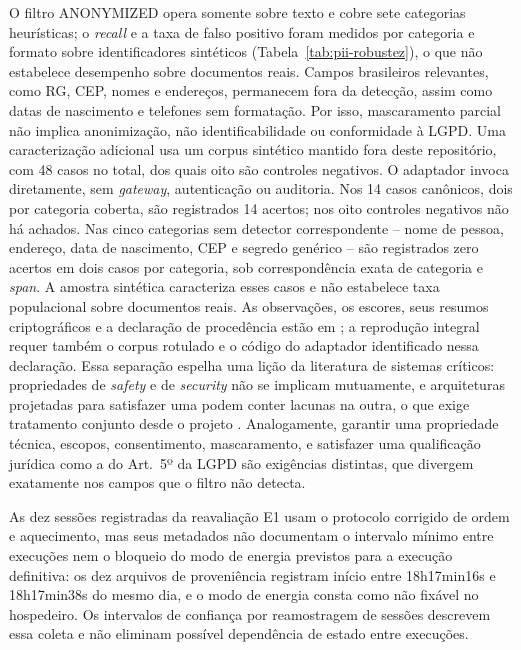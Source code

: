 O filtro ANONYMIZED opera somente sobre texto e cobre sete categorias heurísticas; o \textit{recall} e a taxa de falso positivo foram medidos por categoria e formato sobre identificadores sintéticos (Tabela~\ref{tab:pii-robustez}), o que não estabelece desempenho sobre documentos reais. Campos brasileiros relevantes, como RG, CEP, nomes e endereços, permanecem fora da detecção, assim como datas de nascimento e telefones sem formatação. Por isso, mascaramento parcial não implica anonimização, não identificabilidade ou conformidade à LGPD. Uma caracterização adicional usa um corpus sintético mantido fora deste repositório, com 48 casos no total, dos quais oito são controles negativos. O adaptador invoca  diretamente, sem \textit{gateway}, autenticação ou auditoria. Nos 14 casos canônicos, dois por categoria coberta, são registrados 14 acertos; nos oito controles negativos não há achados. Nas cinco categorias sem detector correspondente -- nome de pessoa, endereço, data de nascimento, CEP e segredo genérico -- são registrados zero acertos em dois casos por categoria, sob correspondência exata de categoria e \textit{span}. A amostra sintética caracteriza esses casos e não estabelece taxa populacional sobre documentos reais. As observações, os escores, seus resumos criptográficos e a declaração de procedência estão em ; a reprodução integral requer também o corpus rotulado e o código do adaptador identificado nessa declaração. Essa separação espelha uma lição da literatura de sistemas críticos: propriedades de \textit{safety} e de \textit{security} não se implicam mutuamente, e arquiteturas projetadas para satisfazer uma podem conter lacunas na outra, o que exige tratamento conjunto desde o projeto \cite{ferrao2022}. Analogamente, garantir uma propriedade técnica, escopos, consentimento, mascaramento, e satisfazer uma qualificação jurídica como a do Art.~5º da LGPD são exigências distintas, que divergem exatamente nos campos que o filtro não detecta.

As dez sessões registradas da reavaliação E1 usam o protocolo corrigido de ordem e aquecimento, mas seus metadados não documentam o intervalo mínimo entre execuções nem o bloqueio do modo de energia previstos para a execução definitiva: os dez arquivos de proveniência registram início entre 18h17min16s e 18h17min38s do mesmo dia, e o modo de energia consta como não fixável no hospedeiro. Os intervalos de confiança por reamostragem de sessões descrevem essa coleta e não eliminam possível dependência de estado entre execuções.


